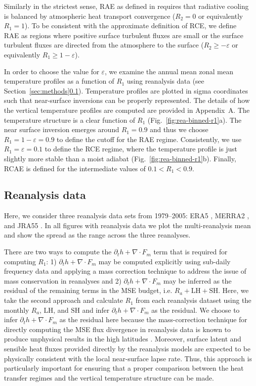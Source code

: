 \documentclass{ametsocV5}
\begin{document}
    Similarly in the strictest sense, RAE as defined in \cite{cronin2016} requires that radiative cooling is balanced by atmospheric heat transport convergence (\(R_{2}=0\) or equivalently \(R_{1}=1\)). To be consistent with the approximate definition of RCE, we define RAE as regions where positive surface turbulent fluxes are small or the surface turbulent fluxes are directed from the atmosphere to the surface (\(R_{2} \ge -\varepsilon \) or equivalently \(R_{1} \ge 1-\varepsilon\)).
      
    In order to choose the value for $\varepsilon$, we examine the annual mean zonal mean temperature profiles as a function of $R_1$ using reanalysis data (see Section~\ref{sec:methods}\ref{subsec:reanalysis}). Temperature profiles are plotted in sigma coordinates such that near-surface inversions can be properly represented. The details of how the vertical temperature profiles are computed are provided in Appendix~A. The temperature structure is a clear function of $R_1$ (Fig.~\ref{fig:rea-binned-r1}a). The near surface inversion emerges around $R_1=0.9$ and thus we choose $R_1=1-\varepsilon=0.9$ to define the cutoff for the RAE regime. Consistently, we use $R_1=\varepsilon=0.1$ to define the RCE regime, where the temperature profile is just slightly more stable than a moist adiabat (Fig.~\ref{fig:rea-binned-r1}b). Finally, RCAE is defined for the intermediate values of $0.1<R_1<0.9$.
    
    \subsection{Reanalysis data}\label{subsec:reanalysis}
    
    Here, we consider three reanalysis data sets from 1979--2005: ERA5 \citep{hersbach2020}, MERRA2 \citep{gelaro2017}, and JRA55 \citep{kobayashi2015}. In all figures with reanalysis data we plot the multi-reanalysis mean and show the spread as the range across the three reanalyses.
    
    There are two ways to compute the $\partial_t h + \nabla\cdot F_m$ term that is required for computing $R_1$: 1) $\partial_t h + \nabla\cdot F_m$ may be computed explicitly using sub-daily frequency data and applying a mass correction technique to address the issue of mass conservation in reanalyses \citep{trenberth1997} and 2) $\partial_t h + \nabla\cdot F_m$ may be inferred as the residual of the remaining terms in the MSE budget, i.e. $R_a + \mathrm{LH + SH}$. Here, we take the second approach and calculate $R_1$ from each reanalysis dataset using the monthly $R_a$, $\mathrm{LH}$, and $\mathrm{SH}$ and infer $\partial_t h +\nabla\cdot F_m$ as the residual. We choose to infer $\partial_t h +\nabla\cdot F_m$ as the residual here because the mass-correction technique for directly computing the MSE flux divergence in reanalysis data is known to produce unphysical results in the high latitudes \citep{porter2010}. Moreover, surface latent and sensible heat fluxes provided directly by the reanalysis models are expected to be physically consistent with the local near-surface lapse rate. Thus, this approach is particularly important for ensuring that a proper comparison between the heat transfer regimes and the vertical temperature structure can be made.
    
\end{document}
